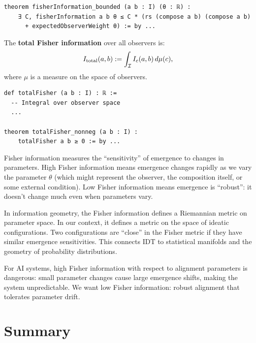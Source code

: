 \begin{lstlisting}[caption={Fisher bounded (IDT\_v3\_Emergence.lean)}]
theorem fisherInformation_bounded (a b : I) (θ : ℝ) :
    ∃ C, fisherInformation a b θ ≤ C * (rs (compose a b) (compose a b)
      + expectedObserverWeight θ) := by ...
\end{lstlisting}

\begin{definition}
\label{def:total-fisher}
The \textbf{total Fisher information} over all observers is:
\[
  I_{\mathrm{total}}(a,b) := \int_{\mathcal{I}} I_c(a,b) \, d\mu(c),
\]
where $\mu$ is a measure on the space of observers.
\end{definition}

\begin{lstlisting}[caption={Total Fisher (IDT\_v3\_Emergence.lean)}]
def totalFisher (a b : I) : ℝ :=
  -- Integral over observer space
  ...

theorem totalFisher_nonneg (a b : I) :
    totalFisher a b ≥ 0 := by ...
\end{lstlisting}

\begin{interpretation}
Fisher information measures the ``sensitivity'' of emergence to changes in
parameters. High Fisher information means emergence changes rapidly as we vary
the parameter $\theta$ (which might represent the observer, the composition
itself, or some external condition). Low Fisher information means emergence is
``robust'': it doesn't change much even when parameters vary.

In information geometry, the Fisher information defines a Riemannian metric on
parameter space. In our context, it defines a metric on the space of ideatic
configurations. Two configurations are ``close'' in the Fisher metric if they
have similar emergence sensitivities. This connects IDT to statistical manifolds
and the geometry of probability distributions.

For AI systems, high Fisher information with respect to alignment parameters
is dangerous: small parameter changes cause large emergence shifts, making the
system unpredictable. We want low Fisher information: robust alignment that
tolerates parameter drift.
\end{interpretation}


\section{Summary}

